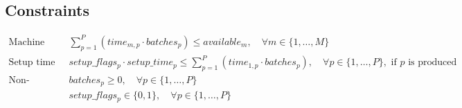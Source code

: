 \documentclass{article}
\begin{document}
\subsection*{Constraints}
\begin{align*}
    \text{Machine usage constraint: } & \sum_{p=1}^{P} (time_{m,p} \cdot batches_{p}) \leq available_{m}, \quad \forall m \in \{1, \ldots, M\} \\
    \text{Setup time constraint for machine 1: } & setup\_flags_{p} \cdot setup\_time_{p} \leq \sum_{p=1}^{P} (time_{1,p} \cdot batches_{p}), \quad \forall p \in \{1, \ldots, P\}, \text{ if } p \text{ is produced} \\
    \text{Non-negativity and binary constraints: } & batches_{p} \geq 0, \quad \forall p \in \{1, \ldots, P\} \\
    & setup\_flags_{p} \in \{0, 1\}, \quad \forall p \in \{1, \ldots, P\}
\end{align*}
\end{document}
